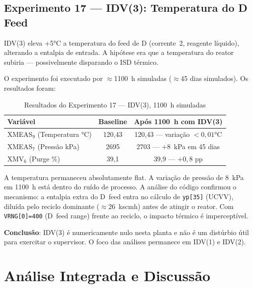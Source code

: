 \subsection{Experimento 17 — IDV(3): Temperatura do D Feed}
\label{sec:exp17}

IDV(3) eleva +5°C a temperatura do feed de D (corrente~2, reagente líquido), alterando a entalpia de entrada. A hipótese era que a temperatura do reator subiria — possivelmente disparando o ISD térmico.

O experimento foi executado por $\approx$1100~h simuladas ($\approx$45 dias simulados). Os resultados foram:

\begin{table}[ht!]
\centering
\caption{Resultados do Experimento 17 — IDV(3), 1100~h simuladas}
\label{tab:exp17}
\begin{tabular}{|l|c|c|}
\hline
\textbf{Variável}              & \textbf{Baseline}  & \textbf{Após 1100~h com IDV(3)} \\
\hline
XMEAS$_9$ (Temperatura °C)     & 120,43             & 120,43 — variação $< 0{,}01$°C \\
XMEAS$_7$ (Pressão kPa)        & 2695               & 2703 — $+8$~kPa em 45 dias     \\
XMV$_6$ (Purge \%)             & 39,1               & 39,9 — $+0{,}8$ pp              \\
\hline
\end{tabular}
\end{table}

A temperatura permaneceu absolutamente flat. A variação de pressão de 8~kPa em 1100~h está dentro do ruído de processo. A análise do código confirmou o mecanismo: a entalpia extra do D~feed entra no cálculo de \texttt{yp[35]} (UCVV), diluída pelo reciclo dominante ($\approx$26~kscmh) antes de atingir o reator. Com \texttt{VRNG[0]=400} (D~feed range) frente ao reciclo, o impacto térmico é imperceptível.

\textbf{Conclusão}: IDV(3) é numericamente nulo nesta planta e não é um distúrbio útil para exercitar o supervisor. O foco das análises permanece em IDV(1) e IDV(2).

\section{Análise Integrada e Discussão}
\label{sec:analise}

